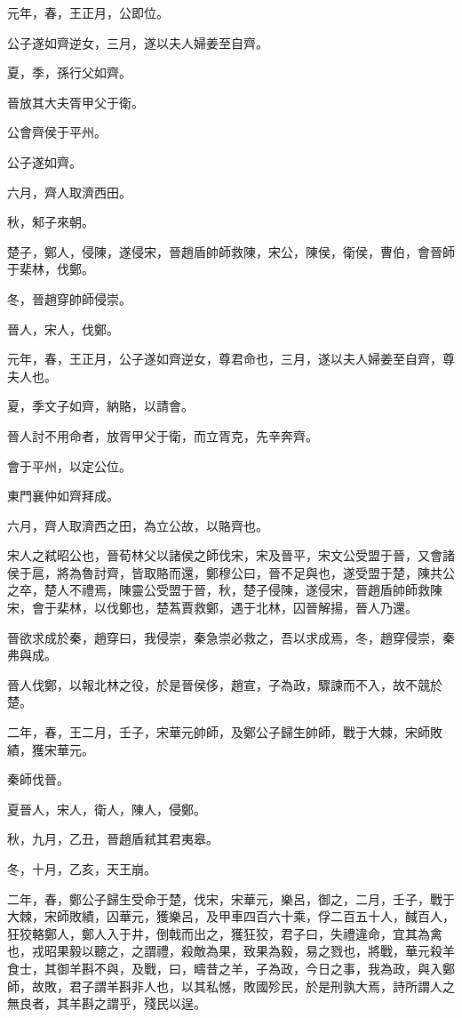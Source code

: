 
\begin{pinyinscope}
元年，春，王正月，公即位。

公子遂如齊逆女，三月，遂以夫人婦姜至自齊。

夏，季，孫行父如齊。

晉放其大夫胥甲父于衛。

公會齊侯于平州。

公子遂如齊。

六月，齊人取濟西田。

秋，邾子來朝。

楚子，鄭人，侵陳，遂侵宋，晉趙盾帥師救陳，宋公，陳侯，衛侯，曹伯，會晉師于棐林，伐鄭。

冬，晉趙穿帥師侵崇。

晉人，宋人，伐鄭。

元年，春，王正月，公子遂如齊逆女，尊君命也，三月，遂以夫人婦姜至自齊，尊夫人也。

夏，季文子如齊，納賂，以請會。

晉人討不用命者，放胥甲父于衛，而立胥克，先辛奔齊。

會于平州，以定公位。

東門襄仲如齊拜成。

六月，齊人取濟西之田，為立公故，以賂齊也。

宋人之弒昭公也，晉荀林父以諸侯之師伐宋，宋及晉平，宋文公受盟于晉，又會諸侯于扈，將為魯討齊，皆取賂而還，鄭穆公曰，晉不足與也，遂受盟于楚，陳共公之卒，楚人不禮焉，陳靈公受盟于晉，秋，楚子侵陳，遂侵宋，晉趙盾帥師救陳宋，會于棐林，以伐鄭也，楚蒍賈救鄭，遇于北林，囚晉解揚，晉人乃還。

晉欲求成於秦，趙穿曰，我侵崇，秦急崇必救之，吾以求成焉，冬，趙穿侵崇，秦弗與成。

晉人伐鄭，以報北林之役，於是晉侯侈，趙宣，子為政，驟諫而不入，故不競於楚。

二年，春，王二月，壬子，宋華元帥師，及鄭公子歸生帥師，戰于大棘，宋師敗績，獲宋華元。

秦師伐晉。

夏晉人，宋人，衛人，陳人，侵鄭。

秋，九月，乙丑，晉趙盾弒其君夷皋。

冬，十月，乙亥，天王崩。

二年，春，鄭公子歸生受命于楚，伐宋，宋華元，樂呂，御之，二月，壬子，戰于大棘，宋師敗績，囚華元，獲樂呂，及甲車四百六十乘，俘二百五十人，馘百人，狂狡輅鄭人，鄭人入于井，倒戟而出之，獲狂狡，君子曰，失禮違命，宜其為禽也，戎昭果毅以聽之，之謂禮，殺敵為果，致果為毅，易之戮也，將戰，華元殺羊食士，其御羊斟不與，及戰，曰，疇昔之羊，子為政，今日之事，我為政，與入鄭師，故敗，君子謂羊斟非人也，以其私憾，敗國殄民，於是刑孰大焉，詩所謂人之無良者，其羊斟之謂乎，殘民以逞。


\end{pinyinscope}
